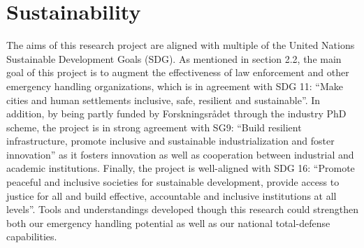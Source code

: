 \chapter{Sustainability}

The aims of this research project are aligned with multiple of the United Nations Sustainable Development Goals (SDG). As mentioned in section 2.2, the main goal of this project is to augment the effectiveness of law enforcement and other emergency handling organizations, which is in agreement with SDG 11: “Make cities and human settlements inclusive, safe, resilient and sustainable”. In addition, by being partly funded by Forskningsrådet through the industry PhD scheme, the project is in strong agreement with SG9: “Build resilient infrastructure, promote inclusive and sustainable industrialization and foster innovation” as it fosters innovation as well as cooperation between industrial and academic institutions. Finally, the project is well-aligned with SDG 16: “Promote peaceful and inclusive societies for sustainable development, provide access to justice for all and build effective, accountable and inclusive institutions at all levels”. Tools and understandings developed though this research could strengthen both our emergency handling potential as well as our national total-defense capabilities.
